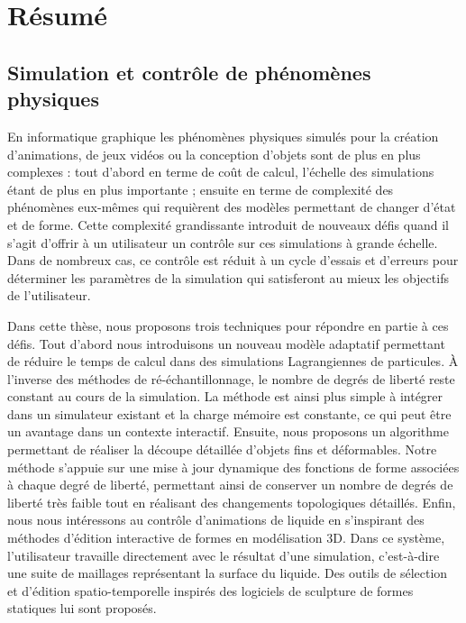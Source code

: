 \chapter*[R\'esum\'e]{R\'esum\'e}

\section*{\Large{Simulation et contrôle de phénomènes physiques}}

En informatique graphique les phénomènes physiques simulés pour la création d'animations, de jeux vidéos ou la conception d'objets sont de plus en plus complexes :
tout d'abord en terme de coût de calcul, l'échelle des simulations étant de plus en plus importante ;
ensuite en terme de complexité des phénomènes eux-mêmes qui requièrent des modèles permettant de changer d'état et de forme. 
Cette complexité grandissante introduit de nouveaux défis quand il s'agit d'offrir à un utilisateur un contrôle sur ces simulations à grande échelle. 
Dans de nombreux cas, ce contrôle est réduit à un cycle d'essais et d'erreurs pour déterminer les paramètres de la simulation qui satisferont au mieux les objectifs de l'utilisateur.

Dans cette thèse, nous proposons trois techniques pour répondre en partie à ces défis. 
Tout d'abord nous introduisons un nouveau modèle adaptatif permettant de réduire le temps de calcul dans des simulations Lagrangiennes de particules. 
À l'inverse des méthodes de ré-échantillonnage, le nombre de degrés de liberté reste constant au cours de la simulation. 
La méthode est ainsi plus simple à intégrer dans un simulateur existant et la charge mémoire est constante, ce qui peut être un avantage dans un contexte interactif. 
Ensuite, nous proposons un algorithme permettant de réaliser la découpe détaillée d'objets fins et déformables. 
Notre méthode s'appuie sur une mise à jour dynamique des fonctions de forme associées à chaque degré de liberté, permettant ainsi de conserver un nombre de degrés de liberté très faible tout en réalisant des changements topologiques détaillés. 
Enfin, nous nous intéressons au contrôle d'animations de liquide en s'inspirant des méthodes d'édition interactive de formes en modélisation 3D. 
Dans ce système, l'utilisateur travaille directement avec le résultat d'une simulation, c'est-à-dire une suite de maillages représentant la surface du liquide. 
Des outils de sélection et d'édition spatio-temporelle inspirés des logiciels de sculpture de formes statiques lui sont proposés.
